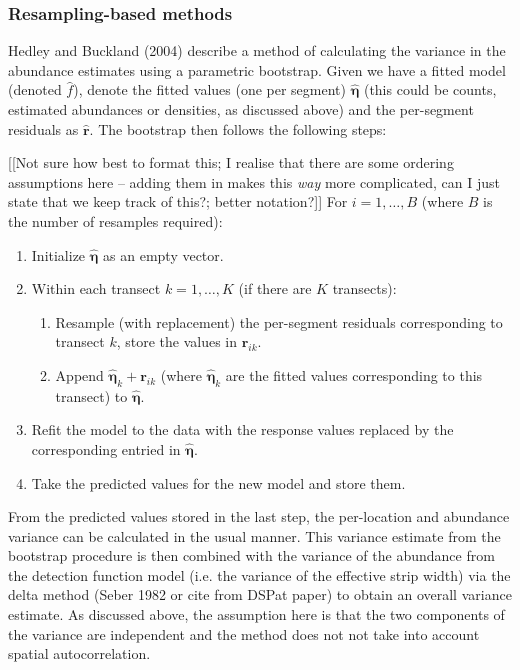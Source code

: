 \documentclass[useAMS,referee]{biom}
\begin{document}
\subsubsection{Resampling-based methods}

Hedley and Buckland (2004) describe a method of calculating the variance in the abundance estimates using a parametric bootstrap. Given we have a fitted model (denoted $\hat{f}$), denote the fitted values (one per segment) $\hat{\bm{\eta}}$ (this could be counts, estimated abundances or densities, as discussed above) and the per-segment residuals as $\hat{\mathbf{r}}$. The bootstrap then follows the following steps:

[[Not sure how best to format this; I realise that there are some ordering assumptions here -- adding them in makes this \textit{way} more complicated, can I just state that we keep track of this?; better notation?]]
For $i=1,\ldots,B$ (where $B$ is the number of resamples required):
\begin{enumerate}
	\item Initialize $\hat{\bm{\eta}}$ as an empty vector.
	\item Within each transect $k=1,\ldots,K$ (if there are $K$ transects):
	\begin{enumerate}
		\item Resample (with replacement) the per-segment residuals corresponding to transect $k$, store the values in $\mathbf{r}_{ik}$.
		\item Append $\hat{\bm{\eta}}_{k}+\mathbf{r}_{ik}$ (where $\hat{\bm{\eta}}_{k}$ are the fitted values corresponding to this transect) to $\hat{\bm{\eta}}$.
	\end{enumerate}
	\item Refit the model to the data with the response values replaced by the corresponding entried in $\hat{\bm{\eta}}$.
	\item Take the predicted values for the new model and store them.
\end{enumerate}
From the predicted values stored in the last step, the per-location and abundance variance can be calculated in the usual manner. This variance estimate from the bootstrap procedure is then combined with the variance of the abundance from the detection function model (i.e. the variance of the effective strip width) via the delta method (Seber 1982 or cite from DSPat paper) to obtain an overall variance estimate. As discussed above, the assumption here is that the two components of the variance are independent and the method does not not take into account spatial autocorrelation.
\end{document}
